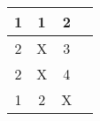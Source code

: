 \begin{tabular}[12pt]{|c|c|c|c|}
    \hline
    1& 1& 2& \\ 
    \hline
    2& X & 3 & \\
    \hline 
    2 & X & 4 & \\
    \hline
    1 & 2 & X& \\
    \hline   
    \end{tabular}
